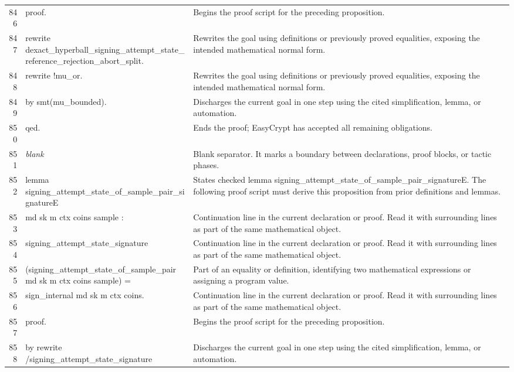 \documentclass[10pt]{article}
\begin{document}
\begin{longtable}{r L{0.53\textwidth} L{0.37\textwidth}}
846 & {\ttfamily\scriptsize proof.} & Begins the proof script for the preceding proposition. \\
847 & {\ttfamily\scriptsize rewrite dexact\_hyperball\_signing\_attempt\_state\_reference\_rejection\_abort\_split.} & Rewrites the goal using definitions or previously proved equalities, exposing the intended mathematical normal form. \\
848 & {\ttfamily\scriptsize rewrite !mu\_or.} & Rewrites the goal using definitions or previously proved equalities, exposing the intended mathematical normal form. \\
849 & {\ttfamily\scriptsize by smt(mu\_bounded).} & Discharges the current goal in one step using the cited simplification, lemma, or automation. \\
850 & {\ttfamily\scriptsize qed.} & Ends the proof; EasyCrypt has accepted all remaining obligations. \\
851 & {\ttfamily\scriptsize \emph{blank}} & Blank separator.  It marks a boundary between declarations, proof blocks, or tactic phases. \\
852 & {\ttfamily\scriptsize lemma signing\_attempt\_state\_of\_sample\_pair\_signatureE} & States checked lemma signing\_attempt\_state\_of\_sample\_pair\_signatureE.  The following proof script must derive this proposition from prior definitions and lemmas. \\
853 & {\ttfamily\scriptsize   md sk m ctx coins sample :} & Continuation line in the current declaration or proof.  Read it with surrounding lines as part of the same mathematical object. \\
854 & {\ttfamily\scriptsize   signing\_attempt\_state\_signature} & Continuation line in the current declaration or proof.  Read it with surrounding lines as part of the same mathematical object. \\
855 & {\ttfamily\scriptsize     (signing\_attempt\_state\_of\_sample\_pair md sk m ctx coins sample) =} & Part of an equality or definition, identifying two mathematical expressions or assigning a program value. \\
856 & {\ttfamily\scriptsize   sign\_internal md sk m ctx coins.} & Continuation line in the current declaration or proof.  Read it with surrounding lines as part of the same mathematical object. \\
857 & {\ttfamily\scriptsize proof.} & Begins the proof script for the preceding proposition. \\
858 & {\ttfamily\scriptsize by rewrite /signing\_attempt\_state\_signature} & Discharges the current goal in one step using the cited simplification, lemma, or automation. \\

\end{longtable}
\end{document}
